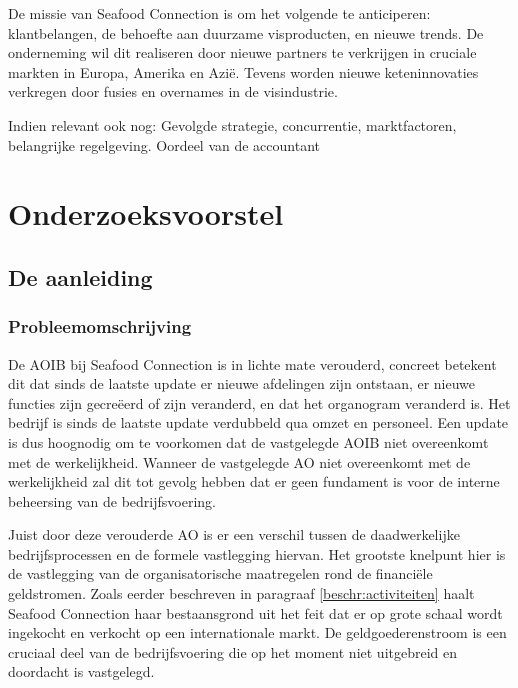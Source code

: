 \documentclass[10pt,a4paper,oneside]{report}
\begin{document}
De missie van Seafood Connection is om het volgende te anticiperen: klantbelangen, de behoefte aan duurzame visproducten, en nieuwe trends. De onderneming wil dit realiseren door nieuwe partners te verkrijgen in cruciale markten in Europa, Amerika en Azië. Tevens worden nieuwe keteninnovaties verkregen door fusies en overnames in de visindustrie. \citep{sfcwebsite}

\bigskip
\noindent
\color{red}
Indien relevant ook nog: Gevolgde strategie, concurrentie, marktfactoren, belangrijke regelgeving. Oordeel van de accountant
\color{black}

\chapter{Onderzoeksvoorstel}
\section{De aanleiding}
\subsection{Probleemomschrijving} \label{beschr:problemen}
De AOIB bij Seafood Connection is in lichte mate verouderd, concreet betekent dit dat sinds de laatste update er nieuwe afdelingen zijn ontstaan, er nieuwe functies zijn gecreëerd of zijn veranderd, en dat het organogram veranderd is. Het bedrijf is sinds de laatste update verdubbeld qua omzet en personeel. Een update is dus hoognodig om te voorkomen dat de vastgelegde AOIB niet overeenkomt met de werkelijkheid. Wanneer de vastgelegde AO niet overeenkomt met de werkelijkheid zal dit tot gevolg hebben dat er geen fundament is voor de interne beheersing van de bedrijfsvoering. \citep{bivpraktijk}

Juist door deze verouderde AO is er een verschil tussen de daadwerkelijke bedrijfsprocessen en de formele vastlegging hiervan. Het grootste knelpunt hier is de vastlegging van de organisatorische maatregelen rond de financiële geldstromen. Zoals eerder beschreven in paragraaf \ref{beschr:activiteiten} haalt Seafood Connection haar bestaansgrond uit het feit dat er op grote schaal wordt ingekocht en verkocht op een internationale markt. De geldgoederenstroom is een cruciaal deel van de bedrijfsvoering die op het moment niet uitgebreid en doordacht is vastgelegd. \citep{aoibsfc}
\end{document}
